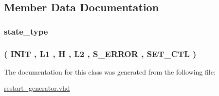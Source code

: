 \subsection{Member Data Documentation}
\subsubsection[{\texorpdfstring{state}{state}}]{ {\bfseries {\bfseries {\bf state\+\_\+type}} \textcolor{vhdlchar}{ }} \hspace{0.3cm}{\ttfamily [Signal]}}\hypertarget{classrestart__generator_1_1fsm_ad5c908d9d78df85b2f0aa3b36b05c3a5}{}\label{classrestart__generator_1_1fsm_ad5c908d9d78df85b2f0aa3b36b05c3a5}
\subsubsection[{\texorpdfstring{state\+\_\+type}{state_type}}]{ {\bfseries \textcolor{vhdlchar}{(}\textcolor{vhdlchar}{ }\textcolor{vhdlchar}{I\+N\+IT}\textcolor{vhdlchar}{ }\textcolor{vhdlchar}{,}\textcolor{vhdlchar}{ }\textcolor{vhdlchar}{L1}\textcolor{vhdlchar}{ }\textcolor{vhdlchar}{,}\textcolor{vhdlchar}{ }\textcolor{vhdlchar}{H}\textcolor{vhdlchar}{ }\textcolor{vhdlchar}{,}\textcolor{vhdlchar}{ }\textcolor{vhdlchar}{L2}\textcolor{vhdlchar}{ }\textcolor{vhdlchar}{,}\textcolor{vhdlchar}{ }\textcolor{vhdlchar}{S\+\_\+\+E\+R\+R\+OR}\textcolor{vhdlchar}{ }\textcolor{vhdlchar}{,}\textcolor{vhdlchar}{ }\textcolor{vhdlchar}{S\+E\+T\+\_\+\+C\+TL}\textcolor{vhdlchar}{ }\textcolor{vhdlchar}{)}\textcolor{vhdlchar}{ }} \hspace{0.3cm}{\ttfamily [Type]}}\hypertarget{classrestart__generator_1_1fsm_a2eac37ebcda1abaa6facae0713adb13c}{}\label{classrestart__generator_1_1fsm_a2eac37ebcda1abaa6facae0713adb13c}


The documentation for this class was generated from the following file\+:\begin{DoxyCompactItemize}
\item 
\hyperlink{restart__generator_8vhd}{restart\+\_\+generator.\+vhd}\end{DoxyCompactItemize}
